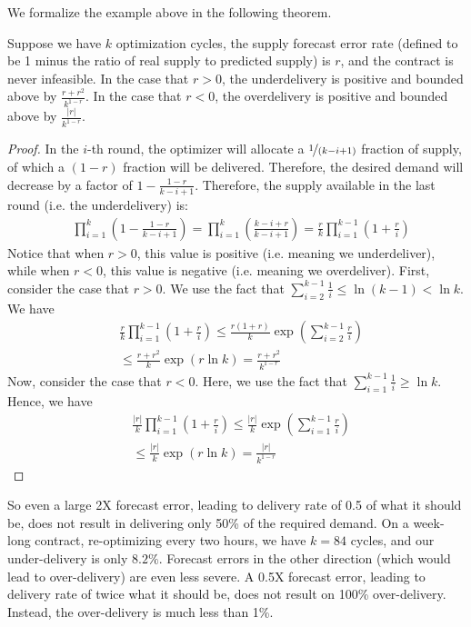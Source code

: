 We formalize the example above in the following theorem.
\begin{theorem}
Suppose we have $k$ optimization cycles, the supply forecast error rate (defined
to be 1 minus the ratio of real supply to predicted supply) is $r$, and the contract is never infeasible.
In the case that $r>0$, the underdelivery is positive and bounded above by $\frac{r+r^2}{k^{1-r}}$.
In the case that $r<0$, the overdelivery is positive and bounded above by $\frac{|r|}{k^{1-r}}$.
\end{theorem}
\begin{proof}
In the $i$-th round, the optimizer will allocate a $\nicefrac{1}{(k-i+1)}$ fraction of
supply, of which a $(1-r)$ fraction will be delivered. Therefore, the desired demand
will decrease by a factor of $1 - \frac{1-r}{k-i+1}$. Therefore, the supply available
 in the last round (i.e. the underdelivery) is:
\begin{align*}
&\prod_{i=1}^k \left(1 - \frac{1-r}{k-i+1}\right)
     = \prod_{i=1}^k \left(\frac{k-i+r}{k-i+1}\right)
     = \frac{r}{k} \prod_{i=1}^{k-1} \left(1+\frac{r}{i}\right)
\end{align*}
Notice that when $r>0$, this value is positive (i.e. meaning we underdeliver), while
when $r<0$, this value is negative (i.e. meaning we overdeliver).
First, consider the case that $r>0$.  We use the fact that
$\sum_{i=2}^{k-1} \frac{1}{i} \le \ln (k-1) < \ln k$.
We have
\begin{align*}
     & \frac{r}{k} \prod_{i=1}^{k-1} \left(1+\frac{r}{i}\right)
     \le \frac{r(1+r)}{k} \exp\left(\sum_{i=2}^{k-1} \frac{r}{i}\right) \\
     &\le \frac{r+r^2}{k} \exp\left(r\ln k \right)
      = \frac{r+r^2}{k^{1-r}}
\end{align*}
Now,
consider the case that $r<0$.  Here, we use the fact that $\sum_{i=1}^{k-1} \frac{1}{i} \ge \ln k$.
Hence, we have
\begin{align*}
     & \frac{|r|}{k} \prod_{i=1}^{k-1} \left(1+\frac{r}{i}\right)
     \le \frac{|r|}{k} \exp\left(\sum_{i=1}^{k-1} \frac{r}{i}\right) \\
     &\le \frac{|r|}{k} \exp\left(r\ln k \right)
      = \frac{|r|}{k^{1-r}}
\end{align*}
\end{proof}
So even a large 2X forecast error, leading to delivery rate of 0.5 of what it should be, does not result in delivering only 50\% of
the required demand.  On a week-long contract, re-optimizing every two hours, we have $k = 84$ cycles, and our under-delivery
is only $8.2\%$.  Forecast errors in the other direction (which would lead to over-delivery) are even less severe.
A 0.5X forecast error, leading to delivery rate of twice what it should be, does not result on 100\% over-delivery.
Instead, the over-delivery is much less than 1\%.

